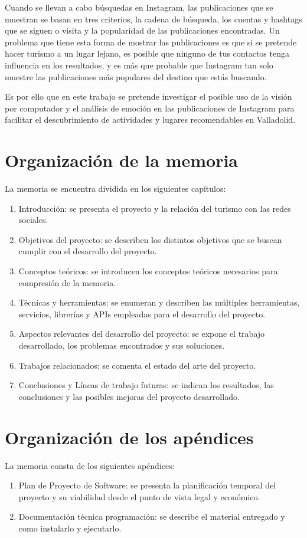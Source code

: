 Cuando se llevan a cabo búsquedas en Instagram, las publicaciones que se muestran se basan en tres criterios, la cadena de búsqueda, los cuentas y hashtags que se siguen o visita y la popularidad de las publicaciones encontradas. Un problema que tiene esta forma de mostrar las publicaciones es que si se pretende hacer turismo a un lugar lejano, es posible que ninguno de tus contactos tenga influencia en los resultados, y es más que probable que Instagram tan solo muestre las publicaciones más populares del destino que estás buscando.

Es por ello que en este trabajo se pretende investigar el posible uso de la visión por computador y el análisis de emoción en las publicaciones de Instagram para facilitar el descubrimiento de actividades y lugares recomendables en Valladolid.

\section{Organización de la memoria}
La memoria se encuentra dividida en los siguientes capítulos:

\begin{enumerate}
    \item Introducción: se presenta el proyecto y la relación del turismo con las redes sociales.
    \item Objetivos del proyecto: se describen los distintos objetivos que se buscan cumplir con el desarrollo del proyecto.
    \item Conceptos teóricos: se introducen los conceptos teóricos necesarios para compresión de la memoria.
    \item Técnicas y herramientas: se enumeran y describen las múltiples herramientas, servicios, librerías y APIs empleadas para el desarrollo del proyecto.
    \item Aspectos relevantes del desarrollo del proyecto: se expone el trabajo desarrollado, los problemas encontrados y sus soluciones.
    \item Trabajos relacionados: se comenta el estado del arte del proyecto.
    \item Conclusiones y Líneas de trabajo futuras: se indican los resultados, las conclusiones y las posibles mejoras del proyecto desarrollado.
\end{enumerate}

\section{Organización de los apéndices}

La memoria consta de los siguientes apéndices:

\begin{enumerate}
    \item Plan de Proyecto de Software: se presenta la planificación temporal del proyecto y su viabilidad desde el punto de vista legal y económico.
    \item Documentación técnica programación: se describe el material entregado y como instalarlo y ejecutarlo.
\end{enumerate}

